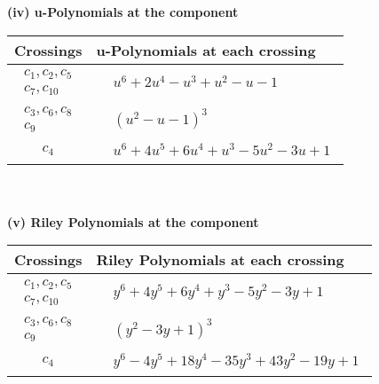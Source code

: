 \documentclass[1p]{elsarticle_modified}
\theoremstyle{definition}
\begin{document}
\newpage\renewcommand{\arraystretch}{1}
\flushleft \textbf{(iv) u-Polynomials at the component}\newline \\
\begin{tabular}{m{50pt}|m{274pt}}
Crossings & \hspace{64pt}u-Polynomials at each crossing \\
\hline $$\begin{aligned}c_{1},c_{2},c_{5}\\c_{7},c_{10}\end{aligned}$$&$\begin{aligned}
&u^6+2 u^4- u^3+u^2- u-1
\end{aligned}$\\
\hline $$\begin{aligned}c_{3},c_{6},c_{8}\\c_{9}\end{aligned}$$&$\begin{aligned}
&(u^2- u-1)^3
\end{aligned}$\\
\hline $$\begin{aligned}c_{4}\end{aligned}$$&$\begin{aligned}
&u^6+4 u^5+6 u^4+u^3-5 u^2-3 u+1
\end{aligned}$\\
\hline
\end{tabular}\\~\\
\newpage\renewcommand{\arraystretch}{1}
\flushleft \textbf{(v) Riley Polynomials at the component}\newline \\
\begin{tabular}{m{50pt}|m{274pt}}
Crossings & \hspace{64pt}Riley Polynomials at each crossing \\
\hline $$\begin{aligned}c_{1},c_{2},c_{5}\\c_{7},c_{10}\end{aligned}$$&$\begin{aligned}
&y^6+4 y^5+6 y^4+y^3-5 y^2-3 y+1
\end{aligned}$\\
\hline $$\begin{aligned}c_{3},c_{6},c_{8}\\c_{9}\end{aligned}$$&$\begin{aligned}
&(y^2-3 y+1)^3
\end{aligned}$\\
\hline $$\begin{aligned}c_{4}\end{aligned}$$&$\begin{aligned}
&y^6-4 y^5+18 y^4-35 y^3+43 y^2-19 y+1
\end{aligned}$\\
\hline
\end{tabular}\\~\\
\end{document}
